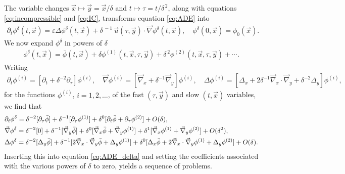\documentclass[11pt]{amsart}
\begin{document}
The variable changes $\vec{x}\mapsto\vec{y}=\vec{x}/\delta$ and
$t\mapsto\tau=t/\delta^{\,2}$, along with equations \eqref{eq:incompressible} and
\eqref{eq:IC}, transforms equation \eqref{eq:ADE} into
\cite{McLaughlin:SIAM_JAM:780}    
%
\begin{align}\label{eq:ADE_delta}
  \partial_t\phi^\delta(t,\vec{x})=\varepsilon\Delta\phi^\delta(t,\vec{x})
                 +\delta^{\,-1}\,\vec{u}(\tau,\vec{y})\cdot\vec{\nabla}\phi^\delta(t,\vec{x}), \quad
      \phi^\delta(0,\vec{x})=\phi_0(\vec{x}).
\end{align}
%
We now expand $\phi^\delta$ in powers of $\delta$ \cite{McLaughlin:SIAM_JAM:780} 
%
\begin{align}\label{eq:Expand}
  \phi^\delta(t,\vec{x})=\bar{\phi}(t,\vec{x})
                 +\delta\phi^{(1)}(t,\vec{x},\tau,\vec{y})
                 +\delta^{\,2}\phi^{(2)}(t,\vec{x},\tau,\vec{y})+\cdots.
\end{align}
%
Writing
%
\begin{align*}
  \partial_t\phi^{(i)}=[\partial_t+\delta^{-2}\partial_\tau]\phi^{(i)}, \quad
  \vec{\nabla}\phi^{(i)}=[\vec{\nabla}_x+\delta^{-1}\vec{\nabla}_y]\phi^{(i)}, \quad
  \Delta\phi^{(i)}=[\Delta_x+2\delta^{-1}\vec{\nabla}_x\cdot\vec{\nabla}_y+\delta^{-2}\Delta_y]\phi^{(i)},
\end{align*}
%
for the functions $\phi^{(i)}$, $i=1,2,\ldots$, of the fast $(\tau,\vec{y})$ and
slow $(t,\vec{x})$ variables, we find that
%
\begin{align}
  &\partial_t\phi^\delta=\delta^{-2}[\partial_\tau\bar{\phi}]
      +\delta^{-1}[\partial_\tau\phi^{(1)}]
      +\delta^0[\partial_t\bar{\phi}+\partial_\tau\phi^{(2)}]+O(\delta),
      \\
  &\vec{\nabla}\phi^\delta=\delta^{-2}[0]
            +\delta^{-1}[\vec{\nabla}_y\bar{\phi}]
            +\delta^0[\vec{\nabla}_x\bar{\phi}+\vec{\nabla}_y\phi^{(1)}]
            +\delta^1[\vec{\nabla}_x\phi^{(1)}+\vec{\nabla}_y\phi^{(2)}]+O(\delta^2),
            \notag\\
  &\Delta\phi^\delta=\delta^{-2}[\Delta_y\bar{\phi}]
      +\delta^{-1}[2\vec{\nabla}_x\cdot\vec{\nabla}_y\bar{\phi}+\Delta_y\phi^{(1)}]
      +\delta^0[\Delta_x\bar{\phi}+2\vec{\nabla}_x\cdot\vec{\nabla}_y\phi^{(1)}+\Delta_y\phi^{(2)}]+O(\delta).
      \notag
\end{align}
%
Inserting this into equation \eqref{eq:ADE_delta} and setting the
coefficients associated with the various powers of $\delta$ to zero,
yields a sequence of problems.
\end{document}
